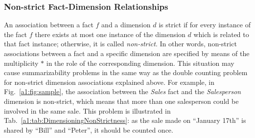 \subsubsection{Non-strict Fact-Dimension Relationships} An association
between a fact $f$ and a dimension $d$ is strict if for every
instance of the fact $f$ there exists at most one instance of the
dimension $d$ which is related to that fact instance; otherwise, it
is called \emph{non-strict}. In other words, non-strict associations
between a fact and a specific dimension are specified by means of
the multiplicity $*$ in the role of the corresponding dimension.
This situation may cause summarizability problems in the same way as
the double counting problem for non-strict dimension associations
explained above. For example, in Fig.~\ref{a1:fig:sample}, the
association between the \emph{Sales} fact and the \emph{Salesperson}
dimension is non-strict, which means that more than one salesperson
could be involved in the same sale. This problem is illustrated in
Tab.~\ref{a1:tab:DimensioningNonStrictness}: as the sale made on
``January 17th'' is shared by ``Bill'' and ``Peter'', it should be
counted once.


\begin{table}
\centering \caption{Double counting problem for sales due to
non-strictness}
     \label{a1:tab:DimensioningNonStrictness}
 \qquad {}
\end{table}

